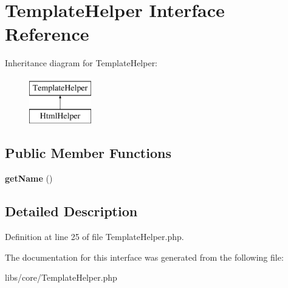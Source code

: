 \hypertarget{interface_template_helper}{\section{\-Template\-Helper \-Interface \-Reference}
\label{interface_template_helper}
}
\-Inheritance diagram for \-Template\-Helper\-:\begin{figure}[H]
\begin{center}
\leavevmode
\includegraphics[height=2.000000cm]{interface_template_helper}
\end{center}
\end{figure}
\subsection*{\-Public \-Member \-Functions}
\begin{DoxyCompactItemize}
\item 
\hypertarget{interface_template_helper_a3d0963e68bb313b163a73f2803c64600}{{\bfseries get\-Name} ()}\label{interface_template_helper_a3d0963e68bb313b163a73f2803c64600}

\end{DoxyCompactItemize}


\subsection{\-Detailed \-Description}


\-Definition at line 25 of file \-Template\-Helper.\-php.



\-The documentation for this interface was generated from the following file\-:\begin{DoxyCompactItemize}
\item 
libs/core/\-Template\-Helper.\-php\end{DoxyCompactItemize}
